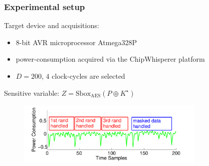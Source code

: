 \begin{frame}
\frametitle{Experimental setup}
Target device and acquisitions: 

\begin{itemize}
\item 8-bit AVR microprocessor Atmega328P
\item power-consumption acquired via the ChipWhisperer \cite{o2014chipwhisperer} platform
\item $D = 200$, $4$ clock-cycles are selected
\end{itemize}

Sensitive variable: $Z = \mathrm{Sbox_{AES}}(P\oplus K^{\star})$\\
%
\begin{figure}
\includegraphics[width=0.8\textwidth]{figures/one_trace.pdf}
\end{figure}


\end{frame}

